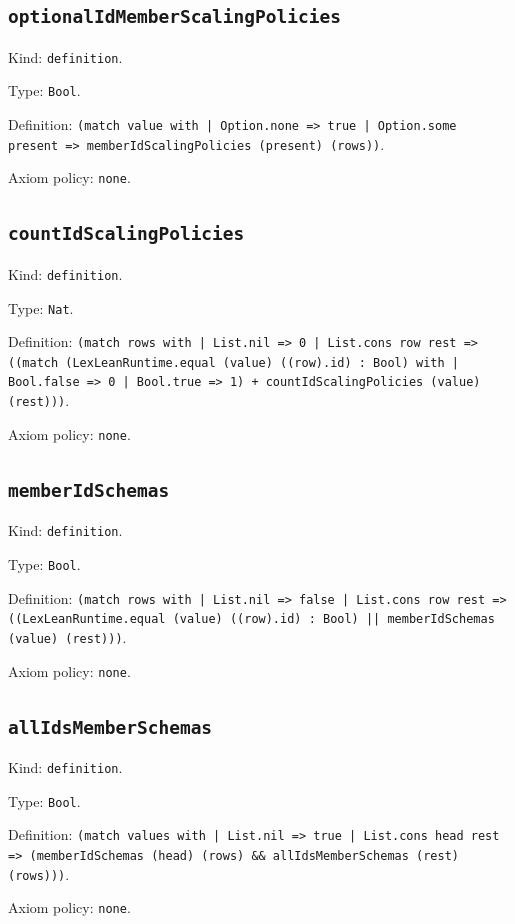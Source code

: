 \documentclass[11pt]{article}
\begin{document}
\subsection*{\texttt{optionalIdMemberScalingPolicies}}
\noindent Kind: \texttt{definition}.\par
\noindent Type: \texttt{Bool}.\par
\noindent Definition: \texttt{(match value with | Option.none => true | Option.some present => memberIdScalingPolicies (present) (rows))}.\par
\noindent Axiom policy: \texttt{none}.\par
\subsection*{\texttt{countIdScalingPolicies}}
\noindent Kind: \texttt{definition}.\par
\noindent Type: \texttt{Nat}.\par
\noindent Definition: \texttt{(match rows with | List.nil => 0 | List.cons row rest => ((match (LexLeanRuntime.equal (value) ((row).id) : Bool) with | Bool.false => 0 | Bool.true => 1) + countIdScalingPolicies (value) (rest)))}.\par
\noindent Axiom policy: \texttt{none}.\par
\subsection*{\texttt{memberIdSchemas}}
\noindent Kind: \texttt{definition}.\par
\noindent Type: \texttt{Bool}.\par
\noindent Definition: \texttt{(match rows with | List.nil => false | List.cons row rest => ((LexLeanRuntime.equal (value) ((row).id) : Bool) || memberIdSchemas (value) (rest)))}.\par
\noindent Axiom policy: \texttt{none}.\par
\subsection*{\texttt{allIdsMemberSchemas}}
\noindent Kind: \texttt{definition}.\par
\noindent Type: \texttt{Bool}.\par
\noindent Definition: \texttt{(match values with | List.nil => true | List.cons head rest => (memberIdSchemas (head) (rows) \&\& allIdsMemberSchemas (rest) (rows)))}.\par
\noindent Axiom policy: \texttt{none}.\par
\end{document}
